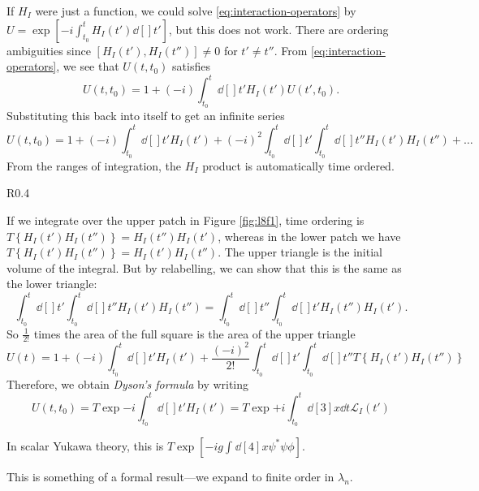 If $H_I$ were just a function, we could solve \eqref{eq:interaction-operators} by $U = \exp[-i \int_{t_0}^{t} H_I(t') \dd[]{t'}]$, but this does not work.
There are ordering ambiguities since $[H_I(t'), H_I(t'')] \neq 0$ for $t' \neq t''$.
From \eqref{eq:interaction-operators}, we see that $U(t, t_0)$ satisfies
\begin{equation}
  U(t, t_0) = 1 + (-i) \int_{t_0}^{t} \dd[]{t'} H_I(t') U(t', t_0).
\end{equation}
Substituting this back into itself to get an infinite series
\begin{equation}
  U(t, t_0) = 1 + (-i) \int_{t_0}^{t} \dd[]{t'} H_I(t') + (-i)^2 \int_{t_0}^{t} \dd[]{t'} \int_{t_0}^{t} \dd[]{t''} H_I(t') H_I(t'') + \dots
\end{equation}
From the ranges of integration, the $H_I$ product is automatically time ordered.

\begin{wrapfigure}{R}{0.4\textwidth}
  \centering
  \def\svgwidth{0.3\columnwidth}
  
  \caption{}
  \label{fig:l8f1}
\end{wrapfigure}
If we integrate over the upper patch in Figure \ref{fig:l8f1}, time ordering is $T \left\{ H_I(t') H_I(t'') \right\} = H_I(t'') H_I(t')$, whereas in the lower patch we have $T \left\{ H_I(t') H_I(t'') \right\} = H_I(t') H_I(t'')$.
The upper triangle is the initial volume of the integral. But by relabelling, we can show that this is the same as the lower triangle:
\begin{equation}
  \int_{t_0}^{t} \dd[]{t'} \int_{t_0}^{t} \dd[]{t''} H_I(t') H_I(t'')
  = \int_{t_0}^{t} \dd[]{t''} \int_{t_0}^{t} \dd[]{t'} H_I(t'') H_I(t').
\end{equation}
So $\frac{1}{2!}$ times the area of the full square is the area of the upper triangle
\begin{equation}
  U(t) = 1 + (-i) \int_{t_0}^{t} \dd[]{t'} H_I(t')
  + \frac{(-i)^2}{2!} \int_{t_0}^{t} \dd[]{t'} \int_{t_0}^{t} \dd[]{t''} T \left\{ H_I(t') H_I(t'') \right\}
\end{equation}
Therefore, we obtain \emph{Dyson's formula} by writing
\begin{equation}
  \label{eq:8-dyson}
  U(t, t_0) = T \exp{-i \int_{t_0}^{t} \dd[]{t'} H_I(t')} = T \exp{+i \int_{t_0}^{t} \dd[3]{x} \dd{t} \mathcal{L}_I(t')}
\end{equation}
\begin{example}
  In scalar Yukawa theory, this is $T \exp[-i g \int_{}^{} \dd[4]{x} \psi^* \psi \phi]$.
\end{example}
This is something of a formal result---we expand to finite order in $\lambda_n$.

